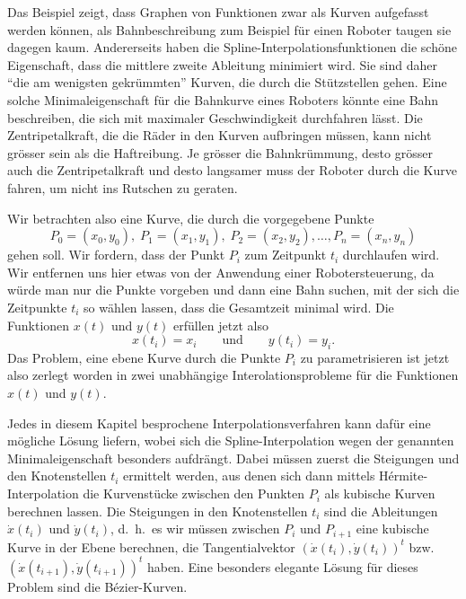 Das Beispiel zeigt, dass Graphen von Funktionen zwar als Kurven aufgefasst
werden können, als Bahnbeschreibung zum Beispiel für einen Roboter taugen
sie dagegen kaum.
Andererseits haben die Spline-Interpolationsfunktionen die schöne
Eigenschaft, dass die mittlere zweite Ableitung minimiert wird.
Sie sind daher ``die am wenigsten gekrümmten'' Kurven, die durch die
Stützstellen gehen. 
Eine solche Minimaleigenschaft für die Bahnkurve eines Roboters könnte eine
Bahn beschreiben, die sich mit maximaler Geschwindigkeit durchfahren lässt.
Die Zentripetalkraft, die die Räder in den Kurven aufbringen müssen,
kann nicht grösser sein als die Haftreibung.
Je grösser die Bahnkrümmung, desto grösser auch die Zentripetalkraft und
desto langsamer muss der Roboter durch die Kurve fahren, um nicht ins
Rutschen zu geraten.

Wir betrachten also eine Kurve, die durch die vorgegebene Punkte
\[
P_0 = (x_0, y_0),\;
P_1 = (x_1, y_1), \;
P_2 = (x_2, y_2),
\dots,
P_n=(x_n, y_n)
\]
gehen soll.
Wir fordern, dass der Punkt $P_i$ zum Zeitpunkt $t_i$ durchlaufen wird.
Wir entfernen uns hier etwas von der Anwendung einer Robotersteuerung,
da würde man nur die Punkte vorgeben und dann eine Bahn suchen, mit der
sich die Zeitpunkte $t_i$ so wählen lassen, dass die Gesamtzeit minimal
wird.
Die Funktionen $x(t)$ und $y(t)$ erfüllen jetzt also
\[
x(t_i) = x_i
\qquad\text{und}\qquad
y(t_i) = y_i.
\]
Das Problem, eine ebene Kurve durch die Punkte $P_i$ zu parametrisieren
ist jetzt also zerlegt worden in zwei unabhängige Interolationsprobleme
für die Funktionen $x(t)$ und $y(t)$.

Jedes in diesem Kapitel besprochene Interpolationsverfahren kann dafür
eine mögliche Lösung liefern, wobei sich die Spline-Interpolation wegen
der genannten Minimaleigenschaft besonders aufdrängt.
Dabei müssen zuerst die Steigungen und den Knotenstellen $t_i$ ermittelt
werden,
aus denen sich dann mittels Hérmite-Interpolation die Kurvenstücke
zwischen den Punkten $P_i$ als kubische Kurven berechnen lassen.
Die Steigungen in den Knotenstellen $t_i$ sind die Ableitungen
$\dot{x}(t_i)$ und $\dot{y}(t_i)$, d.~h.~es wir müssen zwischen
$P_i$ und $P_{i+1}$ eine kubische Kurve in der Ebene berechnen, die
Tangentialvektor $(\dot{x}(t_i),\dot{y}(t_i))^t$
bzw.~$(\dot{x}(t_{i+1}),\dot{y}(t_{i+1}))^t$ haben.
Eine besonders elegante Lösung für dieses Problem sind die Bézier-Kurven.

%
%
